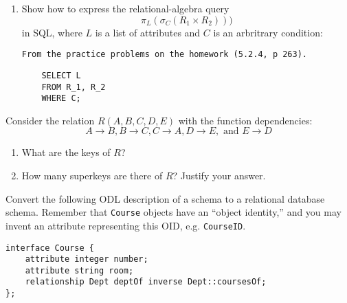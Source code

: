 {\begin{enumerate}
\begin{enumerate}
{\tt
From the practice problems on the homework (5.3.5a, p 279).

There are many ways to solve this one.  One possible answer is:
}
\begin{verbatim}
    SELECT MovieStar.name, MovieStar.address
    FROM MovieStar, MovieExec
    WHERE MovieStar.name = MovieExec.name AND
        MovieStar.address = MovieExec.address AND
        gender = 'F' AND
        netWorth > 10000000;
\end{verbatim}

    \item Show how to express the relational-algebra query
      $$
        \pi_L(\sigma_C(R_1 \times R_2)))
      $$
      in SQL, where $L$ is a list of attributes and $C$ is an arbritrary
      condition:

{\tt From the practice problems on the homework (5.2.4, p 263).}
\begin{verbatim}
    SELECT L 
    FROM R_1, R_2
    WHERE C;
\end{verbatim}

  \end{enumerate}

\end{enumerate}



\item Consider the relation $R(A,B,C,D,E)$ with the function
dependencies: 
$$
	A\rightarrow B,
	B\rightarrow C,
	C \rightarrow A,
	D \rightarrow E, \mbox{ and }
	E\rightarrow D
$$
\begin{enumerate}
    \item What are the keys of $R$?  
	\vspace{1in}
    \item How many superkeys are there of $R$?  Justify your answer.
	\vspace{1in}
\end{enumerate}


\item Convert the following ODL description of a schema to a relational
database schema.  Remember that {\tt Course} objects have an ``object
identity,'' and you may invent an attribute representing this OID, 
e.g. {\tt CourseID}.  

\begin{verbatim}
interface Course {
    attribute integer number;
    attribute string room;
    relationship Dept deptOf inverse Dept::coursesOf;
};


\end{verbatim}}
